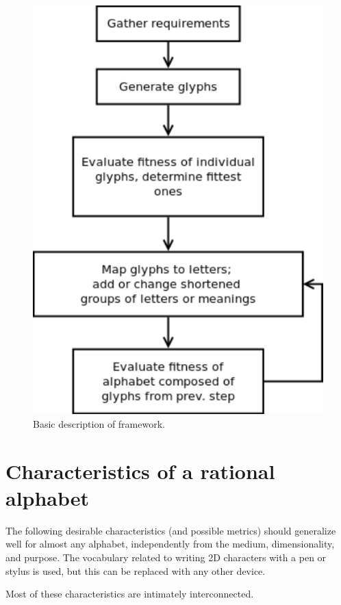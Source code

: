 \documentclass{vgtc}                          %
\begin{document}
\begin{figure}[tb]
\centering
        \includegraphics[width=0.75\hsize]{f.pdf}
\caption{Basic description of framework.}
\end{figure}

\section{Characteristics of a rational alphabet}



The following desirable characteristics (and possible metrics) should generalize well for almost any alphabet, independently from the medium, dimensionality, and purpose. The vocabulary related to writing 2D characters with a pen or stylus is used, but this can be replaced with any other device.  

Most of these characteristics are intimately interconnected.
\end{document}

